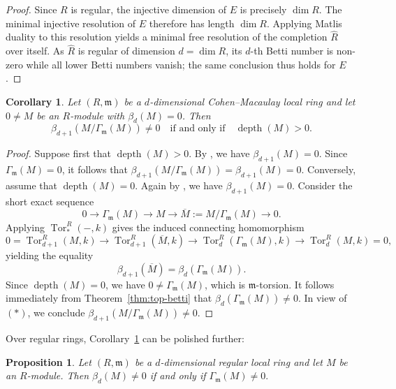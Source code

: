 \documentclass[11pt,a4paper]{amsart}
\numberwithin{equation}{section}
\newtheorem{proposition}[theorem]{Proposition}
\newtheorem{corollary}[theorem]{Corollary}
\theoremstyle{definition}
\theoremstyle{remark}
\newcommand{\depth}{\operatorname{depth}}
\begin{document}
\begin{proof}
Since \(R\) is regular, the injective dimension of \(E\) is precisely \(\dim R\). The minimal injective resolution of \(E\) therefore has length \(\dim R\). Applying Matlis duality to this resolution yields a minimal free resolution of the completion \(\widehat{R}\) over itself. As \(\widehat{R}\) is regular of dimension \(d=\dim R\), its \(d\)-th Betti number is non-zero while all lower Betti numbers vanish; the same conclusion thus holds for \(E\).
	\end{proof}
	
\begin{corollary}\label{46}
	Let \((R,\mathfrak{m})\) be a \(d\)-dimensional Cohen--Macaulay local ring and let \(0 \neq M\) be an \(R\)-module with \(\beta_d(M) = 0\). Then
	\[
	\beta_{d+1}(M/\Gamma_{\mathfrak{m}}(M)) \neq 0 \quad \text{if and only if} \quad \depth(M) > 0.
	\]
\end{corollary}

\begin{proof}
	Suppose first that \(\depth(M) > 0\). By \cite[Theorem V.2]{sc3}, we have \(\beta_{d+1}(M) = 0\). Since \(\Gamma_{\mathfrak{m}}(M) = 0\), it follows that
	\(
	\beta_{d+1}(M/\Gamma_{\mathfrak{m}}(M)) = \beta_{d+1}(M) = 0.
	\)	Conversely, assume that \(\depth(M) = 0\). Again by \cite[Theorem V.2]{sc3}, we have \(\beta_{d+1}(M) = 0\). Consider the short exact sequence
	\[
	0 \longrightarrow \Gamma_{\mathfrak{m}}(M) \longrightarrow M \longrightarrow \overline{M} := M/\Gamma_{\mathfrak{m}}(M) \longrightarrow 0.
	\]
	Applying \(\operatorname{Tor}_*^R(-,k)\) gives the induced connecting homomorphism
	\[
	0 = \operatorname{Tor}_{d+1}^R(M,k) \longrightarrow \operatorname{Tor}_{d+1}^R(\overline{M},k) \longrightarrow \operatorname{Tor}_d^R(\Gamma_{\mathfrak{m}}(M),k) \longrightarrow \operatorname{Tor}_d^R(M,k) = 0,
	\]
	yielding the equality
	\[
	\beta_{d+1}(\overline{M}) = \beta_d(\Gamma_{\mathfrak{m}}(M)). \tag{$\ast$}
	\]
	Since \(\depth(M) = 0\), we have \(0 \neq \Gamma_{\mathfrak{m}}(M)\), which is \(\mathfrak{m}\)-torsion. It follows immediately from Theorem~\ref{thm:top-betti} that \(\beta_d(\Gamma_{\mathfrak{m}}(M)) \neq 0\). In view of \((\ast)\), we conclude \(\beta_{d+1}(M/\Gamma_{\mathfrak{m}}(M)) \neq 0\).
\end{proof}

Over regular rings, Corollary~\ref{46} can be polished further:

\begin{proposition}\label{71}
	Let \((R,\mathfrak{m})\) be a \(d\)-dimensional regular local ring and let \(M\) be an \(R\)-module. Then
	\(
	\beta_d(M) \neq 0\)   {if and only if} \(\Gamma_{\mathfrak{m}}(M) \neq 0.
	\)
\end{proposition}
\end{document}
